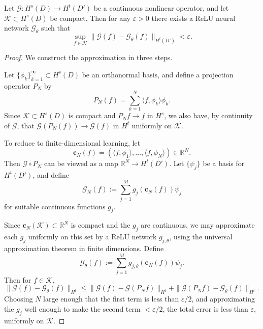 \documentclass[10pt,a4paper]{amsart}
\begin{document}
\begin{theorem}
\label{thm:universal}
Let $\mathcal{G}: H^s(D) \to H^t(D')$ be a continuous nonlinear operator, and let $\mathcal{K} \subset H^s(D)$ be compact. Then for any $\varepsilon > 0$ there exists a ReLU neural network $\mathcal{G}_\theta$ such that
\[
\sup_{f \in \mathcal{K}} \| \mathcal{G}(f) - \mathcal{G}_\theta(f)
\|_{H^t(D')} < \varepsilon.
\]
\end{theorem}

\begin{proof}
We construct the approximation in three steps.

Let $\{ \phi_k \}_{k=1}^\infty \subset H^s(D)$ be an orthonormal basis, and define a projection operator $P_N$ by
\[
P_N (f) = \sum_{k=1}^N \langle f, \phi_k \rangle \phi_k.
\]
Since $\mathcal{K} \subset H^s(D)$ is compact and $P_N f \to f$ in $H^s$, we also have, by continuity of $\mathcal{G}$, that $\mathcal{G}(P_N(f)) \to \mathcal{G}(f)$ in $H^t$ uniformly on $\mathcal{K}$.

To reduce to finite-dimensional learning, let
\[
\mathbf{c}_N(f) = (\langle f, \phi_1 \rangle, \dots,
\langle f, \phi_N \rangle) \in \mathbb{R}^N.
\]
Then $\mathcal{G} \circ P_N$ can be viewed as a map
$\mathbb{R}^N \to H^t(D')$. Let $\{\psi_j\}$ be a basis for $H^t(D')$, and define
\[
\mathcal{G}_N(f) := \sum_{j=1}^M g_j(\mathbf{c}_N(f)) \psi_j
\]
for suitable continuous functions $g_j$.

Since $\mathbf{c}_N(\mathcal{K}) \subset \mathbb{R}^N$ is compact and the $g_j$ are continuous, we may approximate each $g_j$ uniformly on this set by a ReLU network $g_{j,\theta}$, using the universal approximation theorem in finite dimensions. Define
\begin{equation}
    \mathcal{G}_\theta(f) := \sum_{j=1}^M g_{j,\theta}(\mathbf{c}_N(f)) \psi_j.
\end{equation}
Then for $f \in \mathcal{K}$,
\[
\| \mathcal{G}(f) - \mathcal{G}_\theta(f) \|_{H^t}
\leq \| \mathcal{G}(f) - \mathcal{G}(P_N f) \|_{H^t}
+ \| \mathcal{G}(P_N f) - \mathcal{G}_\theta(f) \|_{H^t}.
\]
Choosing $N$ large enough that the first term is less than $\varepsilon/2$, and approximating the $g_j$ well enough to make the second term $< \varepsilon/2$, the total error is less than $\varepsilon$, uniformly on $\mathcal{K}$.
\end{proof}
\end{document}
